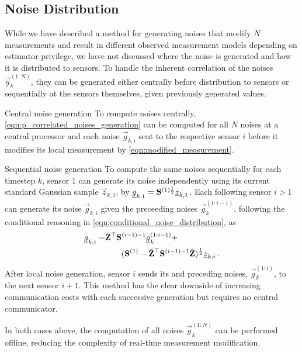 \documentclass[letterpaper, 10 pt, conference]{ieeeconf}
\begin{document}
% 
% 

\subsection{Noise Distribution}\label{subsec:noise_dist}
While we have described a method for generating noises that modify $N$ measurements and result in different observed measurement models depending on estimator privilege, we have not discussed where the noise is generated and how it is distributed to sensors. To handle the inherent correlation of the noises $\vec{g}_{k}^{(1:N)}$, they can be generated either centrally before distribution to sensors or sequentially at the sensors themselves, given previously generated values.
\begin{LaTeXdescription}
  \item[Central noise generation] To compute noises centrally, \eqref{eqn:p_correlated_noises_generation} can be computed for all $N$ noises at a central processor and each noise $\vec{g}_{k,i}$ sent to the respective sensor $i$ before it modifies its local measurement by \eqref{eqn:modified_measurement}.
  \item[Sequential noise generation] To compute the same noises sequentially for each timestep $k$, sensor $1$ can generate its noise independently using its current standard Gaussian sample $\vec{z}_{k,1}$, by ${\underline{g}}_{k,1} = {{\mathbf{S}}}^{(1)\frac{1}{2}}{\underline{z}}_{k,1}$. Each following sensor $i>1$ can generate its noise $\vec{g}_{k,i}$ given the preceeding noises $\vec{g}_k^{(1:i-1)}$, following the conditional reasoning in \eqref{eqn:conditional_noise_distribution}, as
  \begin{equation}
    \begin{split}
      {\underline{g}}_{k,i} = &\bar{{{\mathbf{Z}}}}^\top{\ensuremath{{\mathbf{S}}}}^{(i-1)-1}{\underline{g}}_k^{(1:i-1)} +\\
      &\qquad ({{\mathbf{S}}}^{(1)}-\bar{{{\mathbf{Z}}}}^\top{\ensuremath{{\mathbf{S}}}}^{(i-1)-1}\bar{{{\mathbf{Z}}}})^\frac{1}{2}{\underline{z}}_{k,i}\,.
    \end{split}
  \end{equation}
  After local noise generation, sensor $i$ sends its and preceding noises, $\vec{g}_k^{(1:i)}$, to the next sensor $i+1$. This method has the clear downside of increasing communication costs with each successive generation but requires no central communicator.
\end{LaTeXdescription}
In both cases above, the computation of all noises $\vec{g}_k^{(1:N)}$ can be performed offline, reducing the complexity of real-time measurement modification.
\end{document}
